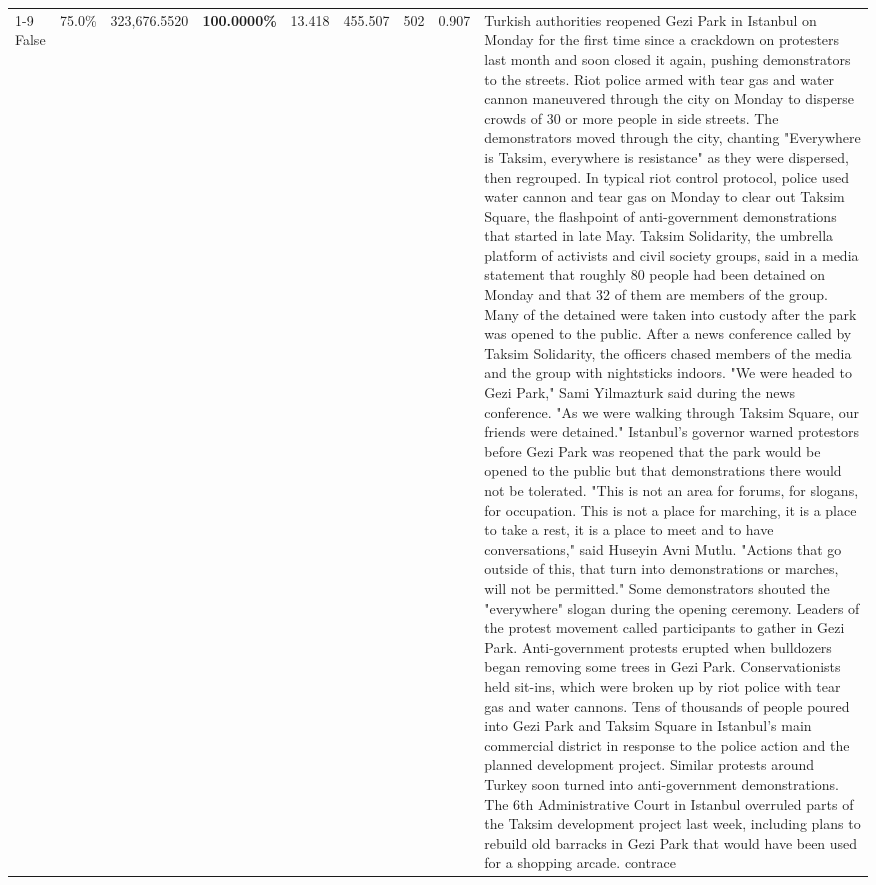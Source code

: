 \begin{table}[H]
\begin{tabular}{lllrlllll}
\cline{1-9}
False & 75.0\% & 323,676.5520 & \bfseries \color{red} 100.0000\% & 13.418 & 455.507 & 502 & 0.907 & Turkish authorities reopened Gezi Park in Istanbul on Monday for the first time since a crackdown on protesters last month and soon closed it again, pushing demonstrators to the streets. Riot police armed with tear gas and water cannon maneuvered through the city on Monday to disperse crowds of 30 or more people in side streets. The demonstrators moved through the city, chanting "Everywhere is Taksim, everywhere is resistance" as they were dispersed, then regrouped. In typical riot control protocol, police used water cannon and tear gas on Monday to clear out Taksim Square, the flashpoint of anti-government demonstrations that started in late May. Taksim Solidarity, the umbrella platform of activists and civil society groups, said in a media statement that roughly 80 people had been detained on Monday and that 32 of them are members of the group. Many of the detained were taken into custody after the park was opened to the public. After a news conference called by Taksim Solidarity, the officers chased members of the media and the group with nightsticks indoors. "We were headed to Gezi Park," Sami Yilmazturk said during the news conference. "As we were walking through Taksim Square, our friends were detained." Istanbul's governor warned protestors before Gezi Park was reopened that the park would be opened to the public but that demonstrations there would not be tolerated. "This is not an area for forums, for slogans, for occupation. This is not a place for marching, it is a place to take a rest, it is a place to meet and to have conversations," said Huseyin Avni Mutlu. "Actions that go outside of this, that turn into demonstrations or marches, will not be permitted." Some demonstrators shouted the "everywhere" slogan during the opening ceremony. Leaders of the protest movement called participants to gather in Gezi Park. Anti-government protests erupted when bulldozers began removing some trees in Gezi Park. Conservationists held sit-ins, which were broken up by riot police with tear gas and water cannons. Tens of thousands of people poured into Gezi Park and Taksim Square in Istanbul's main commercial district in response to the police action and the planned development project. Similar protests around Turkey soon turned into anti-government demonstrations. The 6th Administrative Court in Istanbul overruled parts of the Taksim development project last week, including plans to rebuild old barracks in Gezi Park that would have been used for a shopping arcade. contrace \\

\end{tabular}
\end{table}

